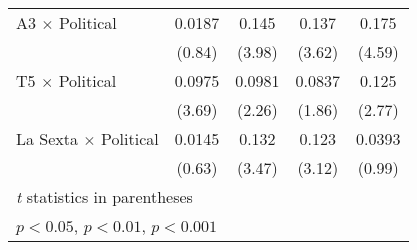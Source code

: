 {\begin{tabular}{l*{4}{c}}
A3 $\times$ Political&   0.0187         &    0.145\sym{***}&    0.137\sym{***}&    0.175\sym{***}\\
                &   (0.84)         &   (3.98)         &   (3.62)         &   (4.59)         \\
T5 $\times$ Political&   0.0975\sym{***}&   0.0981\sym{*}  &   0.0837         &    0.125\sym{**} \\
                &   (3.69)         &   (2.26)         &   (1.86)         &   (2.77)         \\
La Sexta $\times$ Political&   0.0145         &    0.132\sym{***}&    0.123\sym{**} &   0.0393         \\
                &   (0.63)         &   (3.47)         &   (3.12)         &   (0.99)         \\
\hline\hline
\multicolumn{5}{l}{\footnotesize \textit{t} statistics in parentheses}\\
\multicolumn{5}{l}{\footnotesize \sym{*} \(p<0.05\), \sym{**} \(p<0.01\), \sym{***} \(p<0.001\)}\\
\end{tabular}
}
